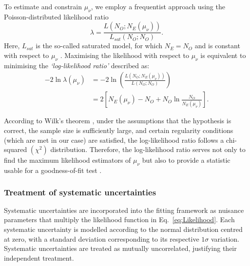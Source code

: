 To estimate and constrain $\mu_\nu$, we employ a frequentist approach using the Poisson-distributed likelihood ratio \cite{ExtendedMaximumLikelihood1990.pdf}
\begin{equation}
\lambda=\frac{L\left(N_O;N_E\left(\mu_\nu\right)\right)}{L_{sat}\left(N_O;N_O\right)}.
\end{equation}
Here, $L_{sat}$ is the so-called saturated model, for which $N_E=N_O$ and is constant with respect to $\mu_\nu$ \cite{PDG.pdf}. Maximising the likelihood with respect to $\mu_\nu$ is equivalent to minimising the \textit{`log-likelihood ratio'} described as:
\begin{align}\label{eq:LogLikelihoodStatsOnly}
-2\ln\lambda\left(\mu_\nu\right)&=
-2\ln\left(\frac{L\left(N_O;N_E\left(\mu_\nu\right)\right)}{L\left(N_O;N_O\right)}\right)\\
&=2\left[N_E\left(\mu_\nu\right)-N_O+N_O\ln\frac{N_O}{N_E\left(\mu_\nu\right)}\right].
\end{align}

According to Wilk's theorem \cite{WilksTheorem1938.pdf}, under the assumptions that the hypothesis is correct, the sample size is sufficiently large, and certain regularity conditions (which are met in our case) are satisfied, the log-likelihood ratio follows a chi-squared $\left(\chi^2\right)$ distribution. Therefore, the log-likelihood ratio serves not only to find the maximum likelihood estimators of $\mu_\nu$ but also to provide a statistic usable for a goodness-of-fit test \cite{PDG.pdf}.


\subsubsection{Treatment of systematic uncertainties}
Systematic uncertainties are incorporated into the fitting framework as nuisance parameters that multiply the likelihood function in Eq.~\ref{eq:Likelihood}. Each systematic uncertainty is modelled according to the normal distribution centred at zero, with a standard deviation corresponding to its respective $1\sigma$ variation. Systematic uncertainties are treated as mutually uncorrelated, justifying their independent treatment.

